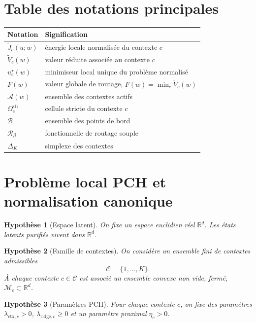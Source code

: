 \documentclass[11pt,a4paper]{article}
\newtheorem{assumption}{Hypothèse}[section]
\newcommand{\R}{\mathbb R}
\newcommand{\Mcal}{\mathcal M}
\newcommand{\Ccal}{\mathcal C}
\newcommand{\Rcal}{\mathcal R}
\newcommand{\Acal}{\mathcal A}
\newcommand{\Bcal}{\mathcal B}
\begin{document}
\section*{Table des notations principales}
\begin{center}
\begin{tabular}{@{}ll@{}}
\toprule
Notation & Signification \\ \midrule
\(\widetilde J_c(u;w)\) & énergie locale normalisée du contexte \(c\) \\
\(\widetilde V_c(w)\) & valeur réduite associée au contexte \(c\) \\
\(u_c^\star(w)\) & minimiseur local unique du problème normalisé \\
\(F(w)\) & valeur globale de routage, \(F(w)=\min_c \widetilde V_c(w)\) \\
\(\Acal(w)\) & ensemble des contextes actifs \\
\(\Omega_c^{\mathrm{str}}\) & cellule stricte du contexte \(c\) \\
\(\Bcal\) & ensemble des points de bord \\
\(\Rcal_\beta\) & fonctionnelle de routage souple \\
\(\Delta_K\) & simplexe des contextes \\ \bottomrule
\end{tabular}
\end{center}

\section{Problème local PCH et normalisation canonique}

\begin{assumption}[Espace latent]
On fixe un espace euclidien réel \(\R^d\). Les états latents purifiés vivent dans \(\R^d\).
\end{assumption}

\begin{assumption}[Famille de contextes]
On considère un ensemble fini de contextes admissibles
\[
\Ccal=\{1,\dots,K\}.
\]
À chaque contexte \(c\in\Ccal\) est associé un ensemble convexe non vide, fermé, \(\Mcal_c\subset\R^d\).
\end{assumption}

\begin{assumption}[Paramètres PCH]
Pour chaque contexte \(c\), on fixe des paramètres \(\lambda_{\mathrm{ctx},c}>0\), \(\lambda_{\mathrm{ridge},c}\ge 0\) et un paramètre proximal \(\eta_c>0\).
\end{assumption}
\end{document}
